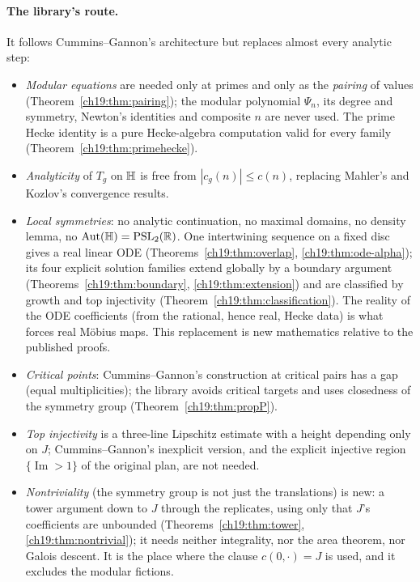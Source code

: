 \paragraph{The library's route.}  It follows Cummins--Gannon's architecture but replaces almost every
analytic step:
\begin{itemize}
\item \emph{Modular equations} are needed only at primes and only as the \emph{pairing} of values (Theorem~\ref{ch19:thm:pairing}); the modular
  polynomial $\Psi_n$, its degree and symmetry, Newton's identities and composite $n$ are never used.  The prime Hecke identity is a pure
  Hecke-algebra computation valid for every family (Theorem~\ref{ch19:thm:primehecke}).
\item \emph{Analyticity} of $T_g$ on $\mathbb{H}$ is free from $|c_g(n)|\le c(n)$, replacing Mahler's and Kozlov's convergence results.
\item \emph{Local symmetries}: no analytic continuation, no maximal domains, no density lemma, no $\operatorname{Aut}(\mathbb{H})=\mathrm{PSL}_2(\mathbb{R})$.  One
  intertwining sequence on a fixed disc gives a real linear ODE (Theorems~\ref{ch19:thm:overlap}, \ref{ch19:thm:ode-alpha}); its four explicit
  solution families extend globally by a boundary argument (Theorems~\ref{ch19:thm:boundary}, \ref{ch19:thm:extension}) and are classified by growth
  and top injectivity (Theorem~\ref{ch19:thm:classification}).  The reality of the ODE coefficients (from the rational, hence real, Hecke data) is
  what forces real M\"obius maps.  This replacement is new mathematics relative to the published proofs.
\item \emph{Critical points}: Cummins--Gannon's construction at critical pairs has a gap (equal multiplicities); the library avoids critical
  targets and uses closedness of the symmetry group (Theorem~\ref{ch19:thm:propP}).
\item \emph{Top injectivity} is a three-line Lipschitz estimate with a height depending only on $J$; Cummins--Gannon's inexplicit version, and the
  explicit injective region $\{\operatorname{Im}>1\}$ of the original plan, are not needed.
\item \emph{Nontriviality} (the symmetry group is not just the translations) is new: a tower argument down to $J$ through the replicates,
  using only that $J$'s coefficients are unbounded (Theorems~\ref{ch19:thm:tower}, \ref{ch19:thm:nontrivial}); it needs neither integrality,
  nor the area theorem, nor Galois descent.  It is the place where the clause $c(0,\cdot)=J$ is used, and it excludes the modular fictions.

\end{itemize}
